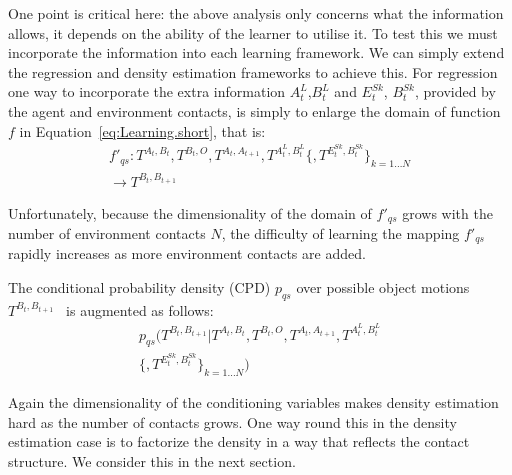 One point is critical here: the above analysis only concerns what the
information allows, it depends on the ability of the learner to
utilise it.  To test this we must incorporate the information into
each learning framework. We can simply extend the regression and density
estimation frameworks to achieve this. For regression one way to
incorporate the extra information $A^{L}_{t}$,$B^{L}_{t}$ and
$E^{Sk}_t$\hspace{-6pt}, $B^{Sk}_t$, provided by the agent and
environment contacts, is simply to enlarge the domain of function~$f$
in Equation~\eqref{eq:Learning.short}, that is:
\begin{multline}
f'_{qs}: T^{A_t, B_t}, T^{B_t, O}, T^{A_{t}, A_{t+1}}, T^{A^{L}_t, B^{L}_t}\{, T^{E^{Sk}_t,B^{Sk}_t}\}_{k=1 \ldots N} \\ 
\longrightarrow T^{B_{t}, B_{t+1}}
\label{eq:Learning.augmented}
\end{multline}

\noindent Unfortunately, because the dimensionality of the domain of $f'_{qs}$ grows with the number of environment contacts $N$,
the difficulty of learning the mapping $f'_{qs}$ rapidly increases
as more environment contacts are added.


The conditional probability density (CPD) $p_{qs}$ over possible object motions $T^{B_{t}, B_{t+1}}$~\cite{kopicki_prediction_2009} is augmented as follows:
\begin{multline}
p_{qs}(T^{B_{t}, B_{t+1}} | T^{A_t, B_t}, T^{B_t, O}, T^{A_{t}, A_{t+1}}, T^{A^{L}_t, B^{L}_t}\\
\{, T^{E^{Sk}_t,B^{Sk}_t}\}_{k=1 \ldots N})
\label{eq:Learning.density}
\end{multline}

Again the dimensionality of the conditioning variables makes density
estimation hard as the number of contacts grows. One way round this in the density estimation case is to factorize the density in a way that
reflects the contact structure. We consider this in the next section. 